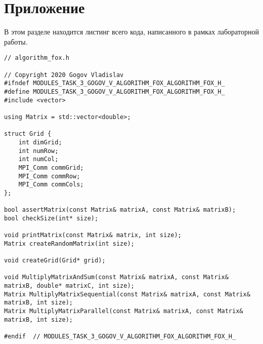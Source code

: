 \documentclass{report}
\begin{document}
\section*{Приложение}
В этом разделе находится листинг всего кода, написанного в рамках лабораторной работы.
\begin{lstlisting}
// algorithm_fox.h

// Copyright 2020 Gogov Vladislav
#ifndef MODULES_TASK_3_GOGOV_V_ALGORITHM_FOX_ALGORITHM_FOX_H_
#define MODULES_TASK_3_GOGOV_V_ALGORITHM_FOX_ALGORITHM_FOX_H_
#include <vector>

using Matrix = std::vector<double>;

struct Grid {
    int dimGrid;
    int numRow;
    int numCol;
    MPI_Comm commGrid;
    MPI_Comm commRow;
    MPI_Comm commCols;
};

bool assertMatrix(const Matrix& matrixA, const Matrix& matrixB);
bool checkSize(int* size);

void printMatrix(const Matrix& matrix, int size);
Matrix createRandomMatrix(int size);

void createGrid(Grid* grid);

void MultiplyMatrixAndSum(const Matrix& matrixA, const Matrix& matrixB, double* matrixC, int size);
Matrix MultiplyMatrixSequential(const Matrix& matrixA, const Matrix& matrixB, int size);
Matrix MultiplyMatrixParallel(const Matrix& matrixA, const Matrix& matrixB, int size);

#endif  // MODULES_TASK_3_GOGOV_V_ALGORITHM_FOX_ALGORITHM_FOX_H_

\end{lstlisting}
\end{document}
